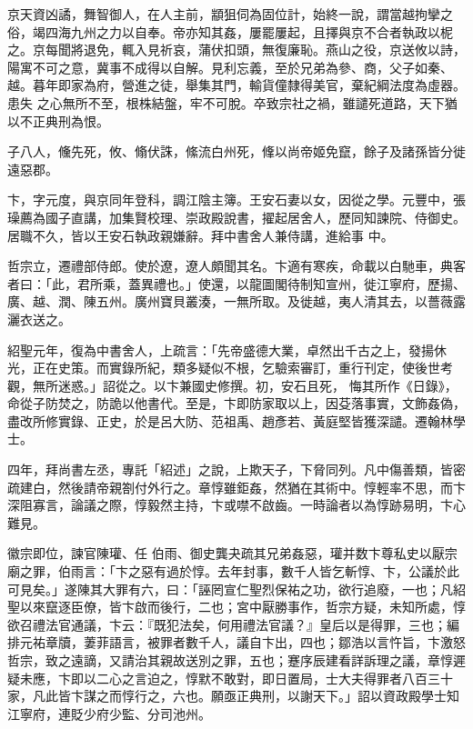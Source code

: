 \begin{pinyinscope}
 京天資凶譎，舞智御人，在人主前，顓狙伺為固位計，始終一說，謂當越拘攣之俗，竭四海九州之力以自奉。帝亦知其姦，屢罷屢起，且擇與京不合者執政以柅之。京每聞將退免，輒入見祈哀，蒲伏扣頭，無復廉恥。燕山之役，京送攸以詩，陽寓不可之意，冀事不成得以自解。見利忘義，至於兄弟為參、商，父子如秦、越。暮年即家為府，營進之徒，舉集其門，輸貨僮隸得美官，棄紀綱法度為虛器。患失
 之心無所不至，根株結盤，牢不可脫。卒致宗社之禍，雖譴死道路，天下猶以不正典刑為恨。



 子八人，儵先死，攸、翛伏誅，絛流白州死，鞗以尚帝姬免竄，餘子及諸孫皆分徙遠惡郡。



 卞，字元度，與京同年登科，調江陰主簿。王安石妻以女，因從之學。元豐中，張璪薦為國子直講，加集賢校理、崇政殿說書，擢起居舍人，歷同知諫院、侍御史。居職不久，皆以王安石執政親嫌辭。拜中書舍人兼侍講，進給事
 中。



 哲宗立，遷禮部侍郎。使於遼，遼人頗聞其名。卞適有寒疾，命載以白馳車，典客者曰：「此，君所乘，蓋異禮也。」使還，以龍圖閣待制知宣州，徙江寧府，歷揚、廣、越、潤、陳五州。廣州寶貝叢湊，一無所取。及徙越，夷人清其去，以薔薇露灑衣送之。



 紹聖元年，復為中書舍人，上疏言：「先帝盛德大業，卓然出千古之上，發揚休光，正在史策。而實錄所紀，類多疑似不根，乞驗索審訂，重行刊定，使後世考觀，無所迷惑。」詔從之。以卞兼國史修撰。初，安石且死，
 悔其所作《日錄》，命從子防焚之，防詭以他書代。至是，卞即防家取以上，因芟落事實，文飾姦偽，盡改所修實錄、正史，於是呂大防、范祖禹、趙彥若、黃庭堅皆獲深譴。遷翰林學士。



 四年，拜尚書左丞，專託「紹述」之說，上欺天子，下脅同列。凡中傷善類，皆密疏建白，然後請帝親劄付外行之。章惇雖鉅姦，然猶在其術中。惇輕率不思，而卞深阻寡言，論議之際，惇毅然主持，卞或噤不啟齒。一時論者以為惇跡易明，卞心難見。



 徽宗即位，諫官陳瓘、任
 伯雨、御史龔夬疏其兄弟姦惡，瓘并数卞尊私史以厭宗廟之罪，伯雨言：「卞之惡有過於惇。去年封事，數千人皆乞斬惇、卞，公議於此可見矣。」遂陳其大罪有六，曰：「誣罔宣仁聖烈保祐之功，欲行追廢，一也；凡紹聖以來竄逐臣僚，皆卞啟而後行，二也；宮中厭勝事作，哲宗方疑，未知所處，惇欲召禮法官通議，卞云：『既犯法矣，何用禮法官議？』皇后以是得罪，三也；編排元祐章牘，萋菲語言，被罪者數千人，議自卞出，四也；鄒浩以言忤旨，卞激怒
 哲宗，致之遠謫，又請治其親故送別之罪，五也；蹇序辰建看詳訴理之議，章惇遲疑未應，卞即以二心之言迫之，惇默不敢對，即日置局，士大夫得罪者八百三十家，凡此皆卞謀之而惇行之，六也。願亟正典刑，以謝天下。」詔以資政殿學士知江寧府，連貶少府少監、分司池州。




\end{pinyinscope}
